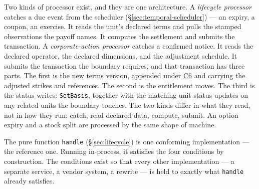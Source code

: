Two kinds of processor exist, and they are one architecture. A \emph{lifecycle processor} catches a due event from the scheduler (\S\ref{sec:temporal-scheduler}) --- an expiry, a coupon, an exercise. It reads the unit's declared terms and pulls the stamped observations the payoff names. It computes the settlement and submits the transaction. A \emph{corporate-action processor} catches a confirmed notice. It reads the declared operator, the declared dimensions, and the adjustment schedule. It submits the transaction the boundary requires, and that transaction has three parts. The first is the new terms version, appended under \hyperref[cond:C6]{C6} and carrying the adjusted strikes and references. The second is the entitlement moves. The third is the status writes: \texttt{SetBasis}, together with the matching unit-status updates on any related units the boundary touches. The two kinds differ in what they read, not in how they run: catch, read declared data, compute, submit. An option expiry and a stock split are processed by the same shape of machine.

The pure function \texttt{handle} (\S\ref{sec:lifecycle}) is one conforming implementation --- the reference one. Running in-process, it satisfies the four conditions by construction. The conditions exist so that every other implementation --- a separate service, a vendor system, a rewrite --- is held to exactly what \texttt{handle} already satisfies.


